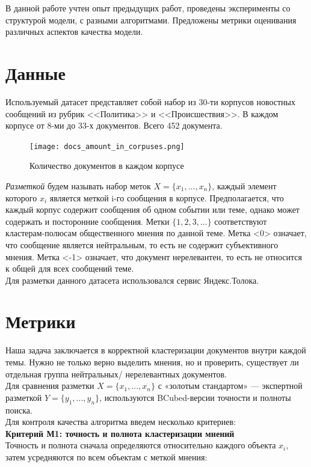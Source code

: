 \documentclass{article}
\begin{document}
В данной работе учтен опыт предыдущих работ, проведены эксперименты со структурой модели, с разными алгоритмами. Предложены метрики оценивания различных аспектов качества модели. 


\section{Данные}
Используемый датасет представляет собой набор из 30-ти корпусов новостных сообщений из рубрик <<Политика>> и <<Происшествия>>. В каждом корпусе от 8-ми до 33-х документов. Всего 452 документа.\\
\begin{figure}[!htb]
\center
    \texttt{[image: docs\_amount\_in\_corpuses.png]}
    \caption{Количество документов в каждом корпусе}
\end{figure}
\textit{Разметкой} будем называть набор меток $X=\{x_1,...,x_n\}$, каждый элемент которого $x_i$ является меткой i-го сообщения в корпусе. Предполагается, что каждый корпус содержит сообщения об одном событии или теме, однако может содержать и посторонние сообщения. Метки $\{1,2,3,...\}$ соответствуют кластерам-полюсам общественного мнения по данной теме. Метка <0> означает, что сообщение является нейтральным, то есть не содержит субъективного мнения. Метка <-1> означает, что документ нерелевантен, то есть не относится к общей для всех сообщений теме.\\

Для разметки данного датасета использовался сервис Яндекс.Толока.

\section{Метрики}
Наша задача заключается в корректной кластеризации документов внутри каждой темы. Нужно не только верно выделить мнения, но и проверить, существует ли отдельная группа нейтральных/ нерелевантных документов. \\
Для сравнения разметки $X=\{x_1,...,x_n\}$ с «золотым стандартом» — экспертной разметкой $Y=\{y_1,...,y_n\}$, используются BCubed-версии точности и полноты поиска.\\
Для контроля качества алгоритма введем несколько критериев:\\

\textbf{Критерий М1: точность и полнота кластеризации мнений}\\
Точность и полнота сначала определяются относительно каждого объекта $x_i$, затем усредняются по всем объектам с меткой мнения:\\
\end{document}

